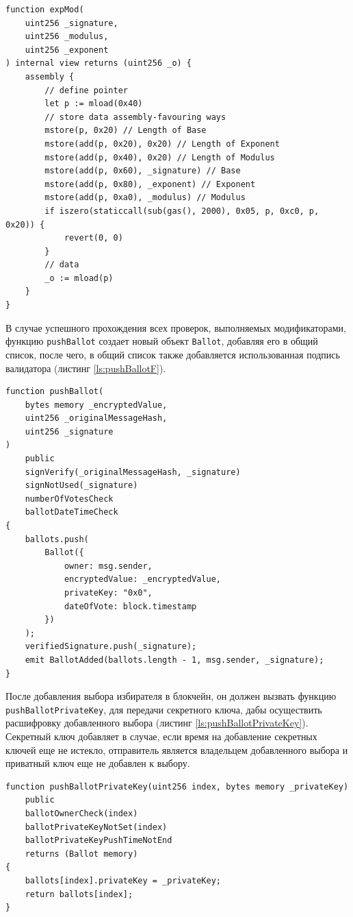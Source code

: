 \begin{lstlisting}[caption={Модульное возведение в степень}, label={ls:expMod}]
function expMod(
    uint256 _signature,
    uint256 _modulus,
    uint256 _exponent
) internal view returns (uint256 _o) {
    assembly {
        // define pointer
        let p := mload(0x40)
        // store data assembly-favouring ways
        mstore(p, 0x20) // Length of Base
        mstore(add(p, 0x20), 0x20) // Length of Exponent
        mstore(add(p, 0x40), 0x20) // Length of Modulus
        mstore(add(p, 0x60), _signature) // Base
        mstore(add(p, 0x80), _exponent) // Exponent
        mstore(add(p, 0xa0), _modulus) // Modulus
        if iszero(staticcall(sub(gas(), 2000), 0x05, p, 0xc0, p, 0x20)) {
            revert(0, 0)
        }
        // data
        _o := mload(p)
    }
}
\end{lstlisting}

В случае успешного прохождения всех проверок, выполняемых модификаторами, функцию \verb|pushBallot| создает новый объект \verb|Ballot|, добавляя его в общий список, после чего, в общий список также добавляется использованная подпись валидатора (листинг \ref{ls:pushBallotF}).

\begin{lstlisting}[caption={Добавление выбора избирателя}, label={ls:pushBallotF}]
function pushBallot(
    bytes memory _encryptedValue,
    uint256 _originalMessageHash,
    uint256 _signature
)
    public
    signVerify(_originalMessageHash, _signature)
    signNotUsed(_signature)
    numberOfVotesCheck
    ballotDateTimeCheck
{
    ballots.push(
        Ballot({
            owner: msg.sender,
            encryptedValue: _encryptedValue,
            privateKey: "0x0",
            dateOfVote: block.timestamp
        })
    );
    verifiedSignature.push(_signature);
    emit BallotAdded(ballots.length - 1, msg.sender, _signature);
}

\end{lstlisting}

После добавления выбора избирателя в блокчейн, он должен вызвать функцию \verb|pushBallotPrivateKey|, для передачи секретного ключа, дабы осуществить расшифровку добавленного выбора (листинг \ref{ls:pushBallotPrivateKey}). Секретный ключ добавляет в случае, если время на добавление секретных ключей еще не истекло, отправитель является владельцем добавленного выбора и приватный ключ еще не добавлен к выбору.

\begin{lstlisting}[caption={Добавление приватного ключа к выбору избирателя}, label={ls:pushBallotPrivateKey}]
function pushBallotPrivateKey(uint256 index, bytes memory _privateKey)
    public
    ballotOwnerCheck(index)
    ballotPrivateKeyNotSet(index)
    ballotPrivateKeyPushTimeNotEnd
    returns (Ballot memory)
{
    ballots[index].privateKey = _privateKey;
    return ballots[index];
}
\end{lstlisting}

